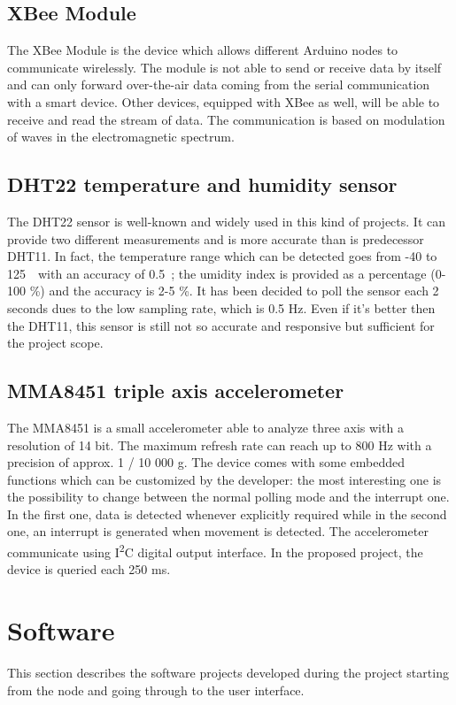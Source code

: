 \documentclass[a4paper,11pt]{scrartcl}
\begin{document}
\subsection{XBee Module}
The XBee Module is the device which allows different Arduino nodes to communicate wirelessly. The module is not able to send or receive data by itself and can only forward over-the-air data coming from the serial communication with a smart device. Other devices, equipped with XBee as well, will be able to receive and read the stream of data. The communication is based on modulation of waves in the electromagnetic spectrum.

\subsection{DHT22 temperature and humidity sensor}
The DHT22 sensor is well-known and widely used in this kind of projects. It can provide two different measurements and is more accurate than is predecessor DHT11. In fact, the temperature range which can be detected goes from -40 to 125\, \celsius\ with an accuracy of 0.5\, \celsius; the umidity index is provided as a percentage (0-100 \%) and the accuracy is 2-5 \%. It has been decided to poll the sensor each 2 seconds dues to the low sampling rate, which is 0.5 Hz. Even if it's better then the DHT11, this sensor is still not so accurate and responsive but sufficient for the project scope. 

\subsection{MMA8451 triple axis accelerometer}
The MMA8451 is a small accelerometer able to analyze three axis with a resolution of 14 bit. The maximum refresh rate can reach up to 800 Hz with a precision of approx. 1 / 10 000 g. The device comes with some embedded functions which can be customized by the developer: the most interesting one is the possibility to change between the normal polling mode and the interrupt one. In the first one, data is detected whenever explicitly required while in the second one, an interrupt is generated when movement is detected. The accelerometer communicate using I\textsuperscript{2}C digital output interface. In the proposed project, the device is queried each 250 ms.

\section{Software}
This section describes the software projects developed during the project starting from the node and going through to the user interface.
\end{document}
